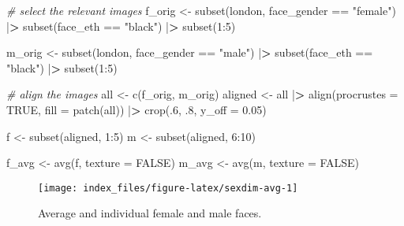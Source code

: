 \documentclass[
  doc,floatsintext]{apa6}
\newenvironment{Shaded}{\begin{snugshade}}{\end{snugshade}}
\newcommand{\AttributeTok}[1]{\textcolor[rgb]{0.77,0.63,0.00}{#1}}
\newcommand{\CommentTok}[1]{\textcolor[rgb]{0.56,0.35,0.01}{\textit{#1}}}
\newcommand{\ConstantTok}[1]{\textcolor[rgb]{0.00,0.00,0.00}{#1}}
\newcommand{\DecValTok}[1]{\textcolor[rgb]{0.00,0.00,0.81}{#1}}
\newcommand{\ErrorTok}[1]{\textcolor[rgb]{0.64,0.00,0.00}{\textbf{#1}}}
\newcommand{\FloatTok}[1]{\textcolor[rgb]{0.00,0.00,0.81}{#1}}
\newcommand{\FunctionTok}[1]{\textcolor[rgb]{0.00,0.00,0.00}{#1}}
\newcommand{\NormalTok}[1]{#1}
\newcommand{\OtherTok}[1]{\textcolor[rgb]{0.56,0.35,0.01}{#1}}
\newcommand{\SpecialCharTok}[1]{\textcolor[rgb]{0.00,0.00,0.00}{#1}}
\newcommand{\StringTok}[1]{\textcolor[rgb]{0.31,0.60,0.02}{#1}}
\begin{document}
\begin{Shaded}
\begin{Highlighting}[]
\CommentTok{\# select the relevant images}
\NormalTok{f\_orig }\OtherTok{\textless{}{-}} \FunctionTok{subset}\NormalTok{(london, face\_gender }\SpecialCharTok{==} \StringTok{"female"}\NormalTok{) }\SpecialCharTok{|}\ErrorTok{\textgreater{}} 
  \FunctionTok{subset}\NormalTok{(face\_eth }\SpecialCharTok{==} \StringTok{"black"}\NormalTok{) }\SpecialCharTok{|}\ErrorTok{\textgreater{}} \FunctionTok{subset}\NormalTok{(}\DecValTok{1}\SpecialCharTok{:}\DecValTok{5}\NormalTok{)}

\NormalTok{m\_orig }\OtherTok{\textless{}{-}} \FunctionTok{subset}\NormalTok{(london, face\_gender }\SpecialCharTok{==} \StringTok{"male"}\NormalTok{) }\SpecialCharTok{|}\ErrorTok{\textgreater{}} 
  \FunctionTok{subset}\NormalTok{(face\_eth }\SpecialCharTok{==} \StringTok{"black"}\NormalTok{) }\SpecialCharTok{|}\ErrorTok{\textgreater{}} \FunctionTok{subset}\NormalTok{(}\DecValTok{1}\SpecialCharTok{:}\DecValTok{5}\NormalTok{)}

\CommentTok{\# align the images}
\NormalTok{all }\OtherTok{\textless{}{-}} \FunctionTok{c}\NormalTok{(f\_orig, m\_orig) }
\NormalTok{aligned }\OtherTok{\textless{}{-}}\NormalTok{ all }\SpecialCharTok{|}\ErrorTok{\textgreater{}}
  \FunctionTok{align}\NormalTok{(}\AttributeTok{procrustes =} \ConstantTok{TRUE}\NormalTok{, }\AttributeTok{fill =} \FunctionTok{patch}\NormalTok{(all)) }\SpecialCharTok{|}\ErrorTok{\textgreater{}}
  \FunctionTok{crop}\NormalTok{(.}\DecValTok{6}\NormalTok{, .}\DecValTok{8}\NormalTok{, }\AttributeTok{y\_off =} \FloatTok{0.05}\NormalTok{)}

\NormalTok{f }\OtherTok{\textless{}{-}} \FunctionTok{subset}\NormalTok{(aligned, }\DecValTok{1}\SpecialCharTok{:}\DecValTok{5}\NormalTok{)}
\NormalTok{m }\OtherTok{\textless{}{-}} \FunctionTok{subset}\NormalTok{(aligned, }\DecValTok{6}\SpecialCharTok{:}\DecValTok{10}\NormalTok{)}

\NormalTok{f\_avg }\OtherTok{\textless{}{-}} \FunctionTok{avg}\NormalTok{(f, }\AttributeTok{texture =} \ConstantTok{FALSE}\NormalTok{)}
\NormalTok{m\_avg }\OtherTok{\textless{}{-}} \FunctionTok{avg}\NormalTok{(m, }\AttributeTok{texture =} \ConstantTok{FALSE}\NormalTok{)}
\end{Highlighting}
\end{Shaded}

\begin{figure}
\texttt{[image: index\_files/figure-latex/sexdim-avg-1]} \caption{Average and individual female and male faces.}\label{fig:sexdim-avg}
\end{figure}
\end{document}
